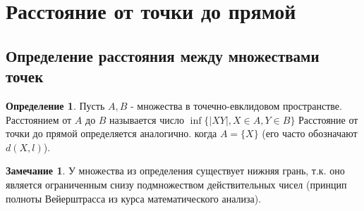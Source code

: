 \documentclass[a4paper, 12pt]{article}
\theoremstyle{definition}
\newtheorem*{definition}{Определение}
\newtheorem*{remark}{Замечание}
\begin{document}
	\section{Расстояние от точки до прямой}
	\subsection{Определение расстояния между множествами точек}
	\begin{definition}
		Пусть $A, B$  - множества в точечно-евклидовом пространстве. Расстоянием от $A$ до $B$ называется число $\inf\{|XY|, X\in A, Y\in B\}$ Расстояние от точки до прямой определяется аналогично. когда $A = \{X\}$ (его часто обозначают $d(X, l)$).
	\end{definition}
	\begin{remark}
		У множества из определения существует нижняя грань, т.к. оно является ограниченным снизу подмножеством действительных чисел (принцип полноты Вейерштрасса из курса математического анализа). 
	\end{remark}
\end{document}
